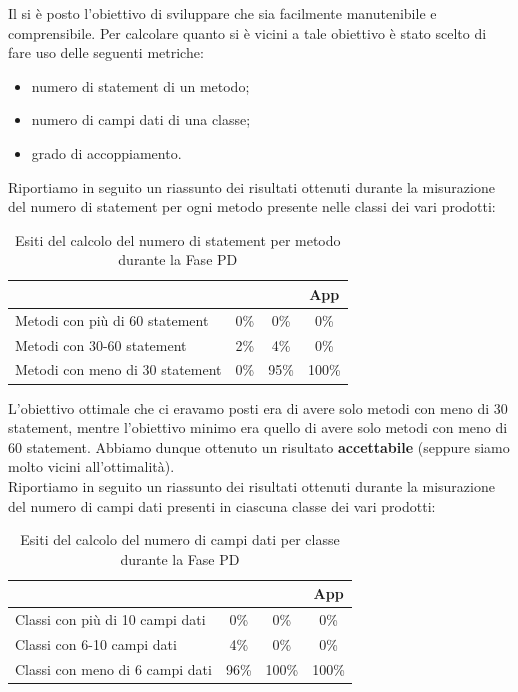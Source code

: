 			 \label{sec:manutebilitaEsitiPD}
				Il \groupname si è posto l'obiettivo di sviluppare  che sia facilmente manutenibile e comprensibile. Per calcolare quanto si è vicini a tale obiettivo è stato scelto di fare uso delle seguenti metriche:
				\begin{itemize}
					\item numero di statement di un metodo;
					\item numero di campi dati di una classe;
					\item grado di accoppiamento.
				\end{itemize}
				Riportiamo in seguito un riassunto dei risultati ottenuti durante la misurazione del numero di statement per ogni metodo presente nelle classi dei vari prodotti:
				\begin{table}[H]
					\centering
					\begin{tabu}{| l | c | c | c |}
						\hline
						                                  &    &    & App     \\ \hline \hline
						Metodi con più di 60 statement    & 0\%      & 0\%     & 0\%     \\ \hline
						Metodi con 30-60 statement        & 2\%      & 4\%     & 0\%     \\ \hline
						Metodi con meno di 30 statement   & 0\%      & 95\%    & 100\%   \\ \hline
					\end{tabu}
					\caption{Esiti del calcolo del numero di statement per metodo durante la Fase PD}
				\end{table}
				L'obiettivo ottimale che ci eravamo posti era di avere solo metodi con meno di 30 statement, mentre l'obiettivo minimo era quello di avere solo metodi con meno di 60 statement. Abbiamo dunque ottenuto un risultato \textbf{accettabile} (seppure siamo molto vicini all'ottimalità).\\
				Riportiamo in seguito un riassunto dei risultati ottenuti durante la misurazione del numero di campi dati presenti in ciascuna classe dei vari prodotti:
				\begin{table}[H]
					\centering
					\begin{tabu}{| l | c | c | c |}
						\hline
						                                  &    &    & App     \\ \hline \hline
						Classi con più di 10 campi dati   & 0\%      & 0\%     & 0\%     \\ \hline
						Classi con 6-10 campi dati        & 4\%      & 0\%     & 0\%     \\ \hline
						Classi con meno di 6 campi dati   & 96\%     & 100\%   & 100\%   \\ \hline
					\end{tabu}
					\caption{Esiti del calcolo del numero di campi dati per classe durante la Fase PD}
				\end{table}

